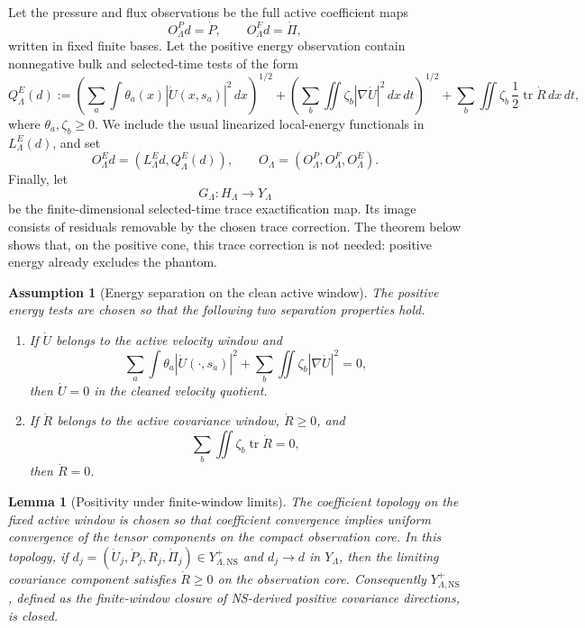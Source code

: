 \documentclass[11pt]{article}
\numberwithin{equation}{section}
\newtheorem{lemma}[theorem]{Lemma}
\newtheorem{assumption}[theorem]{Assumption}
\newcommand{\NS}{\mathrm{NS}}
\begin{document}
Let the pressure and flux observations be the full active coefficient maps
\[
    O^P_\Lambda d=\dot P,
    \qquad
    O^F_\Lambda d=\dot\Pi,
\]
written in fixed finite bases.  Let the positive energy observation contain nonnegative bulk and selected-time tests of the form
\begin{equation}\label{eq:positive-energy-seminorm}
    Q^E_\Lambda(d)
    :=
    \left(
        \sum_a \int \theta_a(x)|\dot U(x,s_a)|^2\,dx
    \right)^{1/2}
    +
    \left(
        \sum_b \iint \zeta_b |\nabla\dot U|^2\,dx\,dt
    \right)^{1/2}
    +
    \sum_b \iint \zeta_b\,\frac12\operatorname{tr}\dot R\,dx\,dt,
\end{equation}
where \(\theta_a,\zeta_b\ge0\).  We include the usual linearized local-energy functionals in \(L^E_\Lambda(d)\), and set
\[
    O^E_\Lambda d=(L^E_\Lambda d,Q^E_\Lambda(d)),
    \qquad
    O_\Lambda=(O^P_\Lambda,O^F_\Lambda,O^E_\Lambda).
\]
Finally, let
\[
    G_\Lambda:H_\Lambda\to Y_\Lambda
\]
be the finite-dimensional selected-time trace exactification map.  Its image consists of residuals removable by the chosen trace correction.  The theorem below shows that, on the positive cone, this trace correction is not needed: positive energy already excludes the phantom.

\begin{assumption}[Energy separation on the clean active window]\label{ass:energy-separation-positive-cone}
The positive energy tests are chosen so that the following two separation properties hold.
\begin{enumerate}[label=(\roman*),leftmargin=2em]
    \item If \(\dot U\) belongs to the active velocity window and
    \[
        \sum_a \int \theta_a|\dot U(\cdot,s_a)|^2
        +
        \sum_b \iint \zeta_b|\nabla\dot U|^2=0,
    \]
    then \(\dot U=0\) in the cleaned velocity quotient.
    \item If \(\dot R\) belongs to the active covariance window, \(\dot R\ge0\), and
    \[
        \sum_b \iint \zeta_b\operatorname{tr}\dot R=0,
    \]
    then \(\dot R=0\).
\end{enumerate}
\end{assumption}

\begin{lemma}[Positivity under finite-window limits]\label{lem:positive-cone-closed}
The coefficient topology on the fixed active window is chosen so that
coefficient convergence implies uniform convergence of the tensor
components on the compact observation core.  In this topology, if
\(d_j=(\dot U_j,\dot P_j,\dot R_j,\dot\Pi_j)\in Y_{\Lambda,\NS}^{+}\) and
\(d_j\to d\) in \(Y_\Lambda\), then the limiting covariance component
satisfies \(\dot R\ge0\) on the observation core.  Consequently
\(Y_{\Lambda,\NS}^{+}\), defined as the finite-window closure of
NS-derived positive covariance directions, is closed.
\end{lemma}
\end{document}
